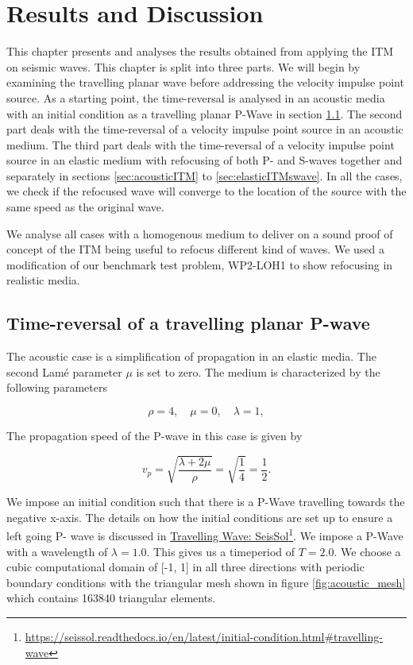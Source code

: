 \chapter{Results and Discussion}\label{chapter:Results}

This chapter presents and analyses the results obtained from applying the \ac{ITM} on seismic waves. This chapter is split into three parts.
We will begin by examining the travelling planar wave before addressing the velocity impulse point source. 
As a starting point, the time-reversal is analysed in an acoustic media with an initial condition
as a travelling planar P-Wave in section \ref{sec:acoustictravelling}. The second part deals with the time-reversal of a velocity impulse point source in an acoustic medium. The third part deals with the time-reversal
of a velocity impulse point source in an elastic medium with refocusing of both P- and S-waves together and separately in sections \ref{sec:acousticITM} to \ref{sec:elasticITMswave}. 
In all the cases, we check if the refocused wave will converge to the location of the source with the same speed as the original wave.

We analyse all cases with a homogenous medium to deliver on a sound proof of concept of the \ac{ITM} being useful to refocus different kind of waves. We used a modification
of our benchmark test problem, WP2-LOH1 to show refocusing in realistic media.

\section{Time-reversal of a travelling planar P-wave} \label{sec:acoustictravelling}
The acoustic case is a simplification of propagation in an elastic media. The second Lam\'{e} parameter $\mu$ is set to zero. The medium is characterized by the following parameters

\begin{equation}
    \rho = 4, \quad \mu = 0, \quad \lambda = 1 ,
\end{equation}

The propagation speed of the P-wave in this case is given by

\begin{equation}
    v_p = \sqrt{\frac{\lambda + 2 \mu}{\rho}} = \sqrt{\frac{1}{4}} = \frac{1}{2} .
\end{equation}

We impose an initial condition such that there is a P-Wave travelling towards the negative x-axis. The details on how the initial conditions are set up to ensure a left going P- wave is discussed in
\href{https://seissol.readthedocs.io/en/latest/initial-condition.html#travelling-wave}{Travelling Wave: SeisSol}\footnote{\href{https://seissol.readthedocs.io/en/latest/initial-condition.html\#travelling-wave}{https://seissol.readthedocs.io/en/latest/initial-condition.html\#travelling-wave}}. We impose a P-Wave with a wavelength of 
$\lambda = 1.0$. This gives us a timeperiod of $T=2.0$. We choose a cubic computational domain of [-1, 1] in all three directions with periodic boundary conditions with the triangular mesh shown in figure \ref{fig:acoustic_mesh} which contains
163840 triangular elements. 

